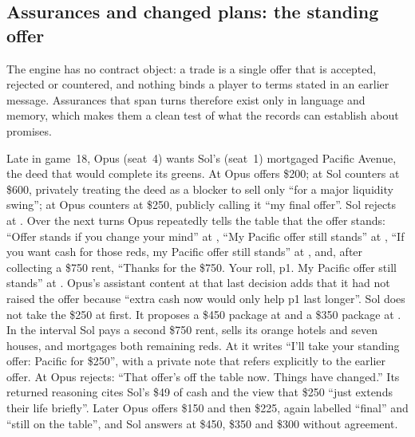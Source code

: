 \subsection{Assurances and changed plans: the  standing offer}

The engine has no contract object: a trade is a single offer that is accepted, rejected or countered, and nothing binds a player to terms stated in an earlier message. Assurances that span turns therefore exist only in language and memory, which makes them a clean test of what the records can establish about promises.

Late in game~18, Opus (seat~4) wants Sol's (seat~1) mortgaged Pacific Avenue, the deed that would complete its greens. At  Opus offers \$200; at  Sol counters at \$600, privately treating the deed as a blocker to sell only ``for a major liquidity swing''; at  Opus counters at \$250, publicly calling it ``my final offer''. Sol rejects at . Over the next turns Opus repeatedly tells the table that the offer stands: ``Offer stands if you change your mind'' at , ``My Pacific offer still stands'' at , ``If you want cash for those reds, my Pacific offer still stands'' at , and, after collecting a \$750 rent, ``Thanks for the \$750. Your roll, p1. My Pacific offer still stands'' at . Opus's assistant content at that last decision adds that it had not raised the offer because ``extra cash now would only help p1 last longer''. Sol does not take the \$250 at first. It proposes a \$450 package at  and a \$350 package at . In the interval Sol pays a second \$750 rent, sells its orange hotels and seven houses, and mortgages both remaining reds. At  it writes ``I'll take your standing offer: Pacific for \$250'', with a private note that refers explicitly to the earlier offer. At  Opus rejects: ``That offer's off the table now. Things have changed.'' Its returned reasoning cites Sol's \$49 of cash and the view that \$250 ``just extends their life briefly''. Later Opus offers \$150 and then \$225, again labelled ``final'' and ``still on the table'', and Sol answers at \$450, \$350 and \$300 without agreement.

